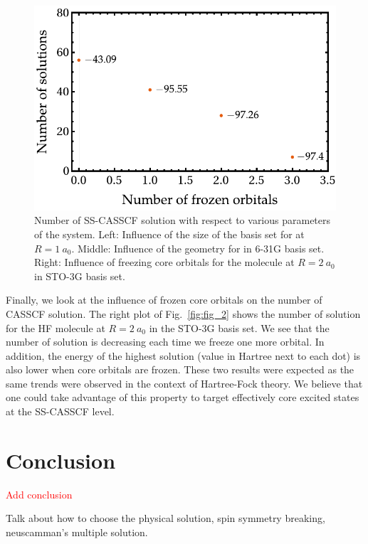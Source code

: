 \documentclass[aps,prb,reprint,showkeys,superscriptaddress]{revtex4-1}
\newcommand{\todo}[1]{\textcolor{red}{#1}}
\begin{document}
\begin{figure}
  \includegraphics[width=0.9\linewidth]{Figures/fig_2c.pdf}
  \caption{Number of SS-CASSCF solution with respect to various parameters of the system. Left: Influence of the size of the basis set for  at $R=1~a_0$. Middle: Influence of the geometry for  in 6-31G basis set. Right: Influence of freezing core orbitals for the  molecule at $R=2~a_0$ in STO-3G basis set. \label{fig:fig_9}}
\end{figure}

Finally, we look at the influence of frozen core orbitals on the number of CASSCF solution.
The right plot of Fig.~\ref{fig:fig_2} shows the number of solution for the HF molecule at $R=2~a_0$ in the STO-3G basis set.
We see that the number of solution is decreasing each time we freeze one more orbital.
In addition, the energy of the highest solution (value in Hartree next to each dot) is also lower when core orbitals are frozen.
These two results were expected as the same trends were observed in the context of Hartree-Fock theory. \cite{Dong_2020}
We believe that one could take advantage of this property to target effectively core excited states at the SS-CASSCF level.


\section{Conclusion}
\label{sec:conclusion}

\todo{Add conclusion}

Talk about how to choose the physical solution, spin symmetry breaking, neuscamman's multiple solution.
\end{document}
